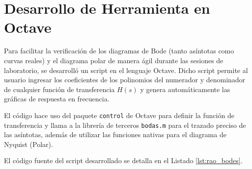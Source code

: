 \section{Desarrollo de Herramienta en Octave}
\label{chap:codigo_octave}

Para facilitar la verificación de los diagramas de Bode (tanto asíntotas como curvas reales) y el diagrama polar de manera ágil durante las sesiones de laboratorio, se desarrolló un script en el lenguaje Octave. Dicho script permite al usuario ingresar los coeficientes de los polinomios del numerador y denominador de cualquier función de transferencia $H(s)$ y genera automáticamente las gráficas de respuesta en frecuencia.

El código hace uso del paquete \texttt{control} de Octave para definir la función de transferencia y llama a la librería de terceros \texttt{bodas.m} para el trazado preciso de las asíntotas, además de utilizar las funciones nativas para el diagrama de Nyquist (Polar).

El código fuente del script desarrollado se detalla en el Listado \ref{lst:rao_bodes}.


